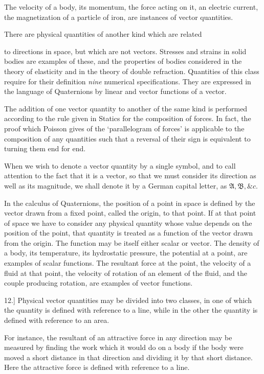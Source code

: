 \documentclass[11pt,a4paper]{article}
\begin{document}
The velocity of a body, its momentum, the force acting on it, an
electric current, the magnetization of a particle of iron, are instances
of vector quantities.

There are physical quantities of another kind which are related

\clearpage

to directions in space, but which are not vectors. Stresses and strains
in solid bodies are examples of these, and the properties of bodies
considered in the theory of elasticity and in the theory of double
refraction. Quantities of this class require for their definition
\textit{nine} numerical specifications. They are expressed in the
language of Quaternions by linear and vector functions of a vector.

The addition of one vector quantity to another of the same kind is
performed according to the rule given in Statics for the composition of
forces. In fact, the proof which Poisson gives of the `parallelogram of
forces' is applicable to the composition of any quantities such that a
reversal of their sign is equivalent to turning them end for end.

When we wish to denote a vector quantity by a single symbol, and to call
attention to the fact that it is a vector, so that we must consider its
direction as well as its magnitude, we shall denote it by a German
capital letter, as \(\mathfrak{A}, \mathfrak{B}, \&c.\)

In the calculus of Quaternions, the position of a point in space is
defined by the vector drawn from a fixed point, called the origin, to
that point. If at that point of space we have to consider any physical
quantity whose value depends on the position of the point, that quantity
is treated as a function of the vector drawn from the origin. The
function may be itself either scalar or vector. The density of a body,
its temperature, its hydrostatic pressure, the potential at a point, are
examples of scalar functions. The resultant force at the point, the
velocity of a fluid at that point, the velocity of rotation of an
element of the fluid, and the couple producing rotation, are examples of
vector functions.

12.] Physical vector quantities may be divided into two classes, in one
of which the quantity is defined with reference to a line, while in the
other the quantity is defined with reference to an area.

For instance, the resultant of an attractive force in any direction may
be measured by finding the work which it would do on a body if the body
were moved a short distance in that direction and dividing it by that
short distance. Here the attractive force is defined with reference to a
line.
\end{document}

